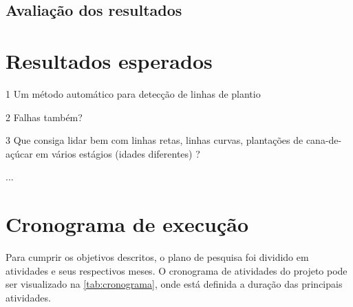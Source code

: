 \documentclass[12pt, a4paper, english, brazil]{article}
\newcommand{\textBlue}[1]{{{\color{blue} #1}}}
\begin{document}
\subsection{Avaliação dos resultados}

\section{Resultados esperados}

\textBlue{
1 Um método automático para detecção de linhas de plantio

2 Falhas também?

3 Que consiga lidar bem com linhas retas, linhas curvas, plantações de cana-de-açúcar em vários estágios (idades diferentes) ?

...
}


\section{Cronograma de execução}

Para cumprir os objetivos descritos, o plano de pesquisa foi dividido em atividades e seus respectivos meses. O cronograma de atividades do projeto pode ser visualizado na \autoref{tab:cronograma}, onde está definida a
duração das principais atividades.
\end{document}
